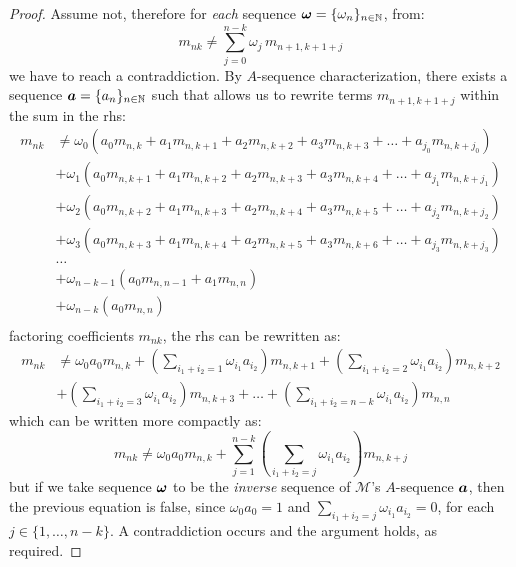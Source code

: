 \begin{proof}
    Assume not, therefore for \emph{each} sequence $\boldsymbol{\omega}=\lbrace \omega_{n}\rbrace_{n\in\mathbb{N}}$,
    from:
    \begin{displaymath}
        m_{nk}\neq\sum_{j=0}^{n-k}{\omega_{j}\,m_{n+1,k+1+j}}
    \end{displaymath}
    we have to reach a contraddiction. By $A$-sequence characterization, 
    there exists a sequence $\boldsymbol{a}=\lbrace a_{n}\rbrace_{n\in\mathbb{N}}$
    such that allows us to rewrite terms $m_{n+1,k+1+j}$
    within the sum in the \ac{rhs}:
    \begin{displaymath}
        \begin{split}
            m_{nk} &\neq \omega_{0}\left(a_{0}m_{n,k}+a_{1}m_{n,k+1}+a_{2}m_{n,k+2}+a_{3}m_{n,k+3}+\ldots+a_{j_{0}}m_{n,k+j_{0}}\right)\\
                   &+ \omega_{1}\left(a_{0}m_{n,k+1}+a_{1}m_{n,k+2}+a_{2}m_{n,k+3}+a_{3}m_{n,k+4}+\ldots+a_{j_{1}}m_{n,k+j_{1}}\right)\\
                   &+ \omega_{2}\left(a_{0}m_{n,k+2}+a_{1}m_{n,k+3}+a_{2}m_{n,k+4}+a_{3}m_{n,k+5}+\ldots+a_{j_{2}}m_{n,k+j_{2}}\right)\\
                   &+ \omega_{3}\left(a_{0}m_{n,k+3}+a_{1}m_{n,k+4}+a_{2}m_{n,k+5}+a_{3}m_{n,k+6}+\ldots+a_{j_{3}}m_{n,k+j_{3}}\right)\\
                   &\ldots\\
                   &+ \omega_{n-k-1}\left(a_{0}m_{n,n-1}+a_{1}m_{n,n}\right)\\
                   &+ \omega_{n-k}\left(a_{0}m_{n,n}\right)\\
        \end{split}
    \end{displaymath}
    factoring coefficients $m_{nk}$, the \ac{rhs} can be rewritten as:
    \begin{displaymath}
        \begin{split}
            m_{nk}&\neq \omega_{0}a_{0}m_{n,k} + \left(\sum_{i_{1}+i_{2}=1}{\omega_{i_{1}}a_{i_{2}}}\right)m_{n,k+1}
                + \left(\sum_{i_{1}+i_{2}=2}{\omega_{i_{1}}a_{i_{2}}}\right)m_{n,k+2}\\
                &+ \left(\sum_{i_{1}+i_{2}=3}{\omega_{i_{1}}a_{i_{2}}}\right)m_{n,k+3}
                + \ldots 
                + \left(\sum_{i_{1}+i_{2}=n-k}{\omega_{i_{1}}a_{i_{2}}}\right)m_{n,n}
        \end{split}
    \end{displaymath}
    which can be written more compactly as:
    \begin{displaymath}
        m_{nk} \neq \omega_{0}a_{0}m_{n,k} +
            \sum_{j=1}^{n-k}{\left(\sum_{i_{1}+i_{2}=j}{\omega_{i_{1}}a_{i_{2}}}\right)m_{n,k+j}}
    \end{displaymath}
    but if we take sequence $\boldsymbol{\omega}$ to be the \emph{inverse} sequence of 
    $\mathcal{M}$'s $A$-sequence $\boldsymbol{a}$, then the previous equation is false,
    since $\omega_{0}a_{0}=1$ and $\sum_{i_{1}+i_{2}=j}{\omega_{i_{1}}a_{i_{2}}}=0$,
    for each $j\in\lbrace1,\ldots,n-k\rbrace$. A contraddiction occurs and the argument holds,
    as required.        
\end{proof}
